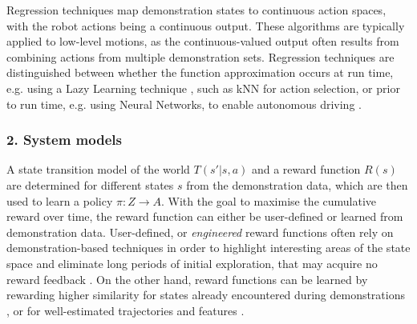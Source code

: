 Regression techniques map demonstration states to continuous action spaces, with the robot actions being a continuous output. These algorithms are typically applied to low-level motions, as the continuous-valued output often results from combining actions from multiple demonstration sets. Regression techniques are distinguished between whether the function approximation occurs at run time, e.g. using a Lazy Learning technique \cite{atkeson1997locally}, such as kNN for action selection, or prior to run time, e.g. using Neural Networks, to enable autonomous driving \cite{pomerleau1991efficient}.

\subsubsection{2. System models}
A state transition model of the world $T(s'|s, a)$ and a reward function $R(s)$ are determined for different states $s$ from the demonstration data, which are then used to learn a policy $\pi : Z \rightarrow A$. With the goal to maximise the cumulative reward over time, the reward function can either be user-defined or learned from demonstration data.
User-defined, or \textit{engineered} reward functions often rely on demonstration-based techniques in order to highlight interesting areas of the state space and eliminate long periods of initial exploration, that may acquire no reward feedback \cite{smart2002effective}.
On the other hand, reward functions can be learned by rewarding higher similarity for states already encountered during demonstrations \cite{atkeson1997robot}, or for well-estimated trajectories and features \cite{abbeel2004apprenticeship}.
